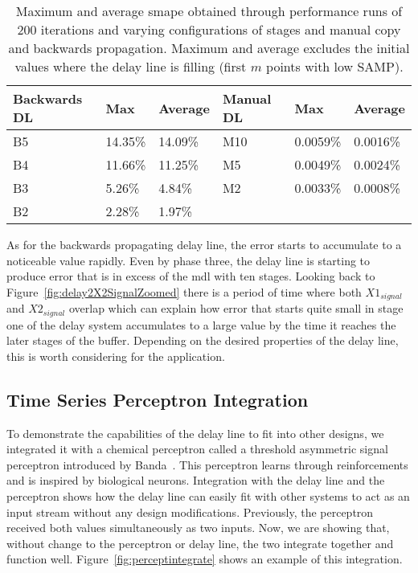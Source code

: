 \begin{table}[ht]
	\centering
	\caption[Error for Both Delay Lines]{Maximum and average \gls{smape} obtained through performance runs of 200 iterations and varying configurations of stages and manual copy and backwards propagation. Maximum and average excludes the initial values where the delay line is filling (first $m$ points with low SAMP).}
	\label{tab:maxSAMP}
	\begin{tabular}{llllll}
	Backwards DL & Max     & Average & Manual DL & Max      & Average  \\ \hline
	B5           & 14.35\% & 14.09\% & M10       & 0.0059\% & 0.0016\% \\
	B4           & 11.66\% & 11.25\% & M5        & 0.0049\% & 0.0024\% \\
	B3           & 5.26\%  & 4.84\%  & M2        & 0.0033\% & 0.0008\% \\
	B2           & 2.28\%  & 1.97\%  & ~         & ~        & ~        \\
	\end{tabular}
\end{table}

As for the backwards propagating delay line, the error starts to accumulate to a noticeable value rapidly. Even by phase three, the delay line is starting to produce error that is in excess of the \gls{mdl} with ten stages. Looking back to Figure~\ref{fig:delay2X2SignalZoomed} there is a period of time where both $X1_{signal}$ and $X2_{signal}$ overlap which can explain how error that starts quite small in stage one of the delay system accumulates to a large value by the time it reaches the later stages of the buffer. Depending on the desired properties of the delay line, this is worth considering for the application.

\subsection{Time Series Perceptron Integration}
To demonstrate the capabilities of the delay line to fit into other designs, we integrated it with a chemical perceptron called a threshold asymmetric signal perceptron introduced by Banda~\cite{Banda2014-bp}. This perceptron learns through reinforcements and is inspired by biological neurons. Integration with the delay line and the perceptron shows how the delay line can easily fit with other systems to act as an input stream without any design modifications. Previously, the perceptron received both values simultaneously as two inputs. Now, we are showing that, without change to the perceptron or delay line, the two integrate together and function well. Figure~\ref{fig:perceptintegrate} shows an example of this integration.

